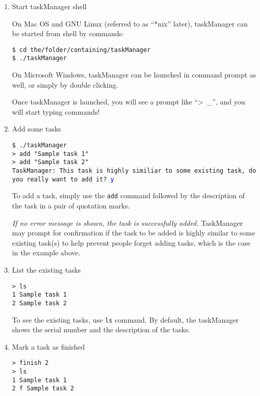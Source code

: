 \documentclass[12pt, a4paper]{article}
\begin{document}
\noindent \begin{enumerate}
\item Start taskManager shell

On Mac OS and GNU Linux (referred to as ``*nix'' later), taskManager can be started from shell by commands:

\texttt{\$ cd the/folder/containing/taskManager\\
  \$ ./taskManager \footnotemark}

On Microsoft Windows, taskManager can be launched in command prompt as well, or simply by double clicking.

Once taskManager is launched, you will see a prompt like ``\textgreater \ \_'', and you will start typing commands!


\item Add some tasks

\texttt{\$ ./taskManager\\
  \textgreater \  add "Sample task 1"\\
  \textgreater \  add "Sample task 2"\\
  TaskManager: This task is highly similiar to some existing task, do you really want to add it? \textcolor{blue}{y}}

To add a task, simply use the \texttt{add} command followed by the description of the task in a pair of quotation marks. 

\emph{If no error message is shown, the task is successfully added.}
TaskManager may prompt for confirmation if the task to be added is highly similar to some existing task(s) to help prevent people forget adding tasks, which is the case in the example above.

\item List the existing tasks

\texttt{\textgreater \ ls\\
  1   Sample task 1\\
  2   Sample task 2}

To see the existing tasks, use \texttt{ls} command. By default, the taskManager shows the serial number and the description of the tasks.

\item Mark a task as finished

\texttt{\textgreater \ finish 2\\
  \textgreater \ ls\\
  1   Sample task 1\\
  2 f Sample task 2}
 

\end{enumerate}
\end{document}
